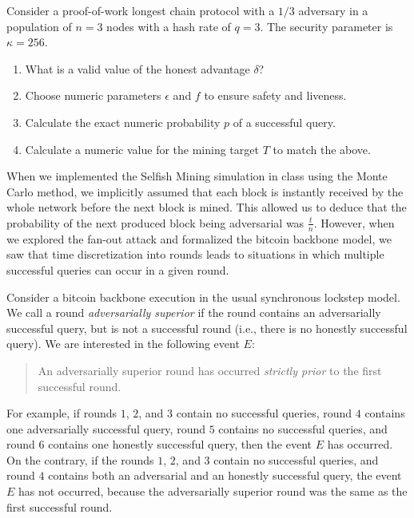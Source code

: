 \begin{problems}
    \item Consider a proof-of-work longest chain protocol with a $1/3$ adversary
        in a population of $n = 3$ nodes with a hash rate of $q = 3$.
        The security parameter is $\kappa = 256$.

        \begin{enumerate}
            \item What is a valid value of the honest advantage $\delta$?
            \item Choose numeric parameters $\epsilon$ and $f$ to ensure
                safety and liveness.
            \item Calculate the exact numeric probability $p$ of a successful
                query.
            \item Calculate a numeric value for the mining target $T$ to
                match the above.
        \end{enumerate}

    \item When we implemented the Selfish Mining simulation in class using the
          Monte Carlo method, we implicitly assumed that each block is instantly
          received by the whole network before the next block is mined. This
          allowed us to deduce that the probability of the next produced block
          being adversarial was $\frac{t}{n}$. However, when we explored the
          fan-out attack and formalized the bitcoin backbone model, we saw that
          time discretization into rounds leads to situations in which multiple
          successful queries can occur in a given round.

          Consider a bitcoin backbone execution in the usual synchronous
          lockstep model. We call a round \emph{adversarially superior} if the
          round contains an adversarially successful query, but is not a
          successful round (i.e., there is no honestly successful query). We are
          interested in the following event $E$:

          \begin{quote}
            An adversarially superior round has occurred \emph{strictly prior}
            to the first successful round.
          \end{quote}

          For example, if rounds $1$, $2$, and $3$ contain no successful
          queries, round $4$ contains one adversarially successful query, round
          $5$ contains no successful queries, and round $6$ contains one
          honestly successful query, then the event $E$ has occurred. On the
          contrary, if the rounds $1$, $2$, and $3$ contain no successful
          queries, and round $4$ contains both an adversarial and an honestly
          successful query, the event $E$ has not occurred, because the
          adversarially superior round was the same as the first successful
          round.


\end{problems}
